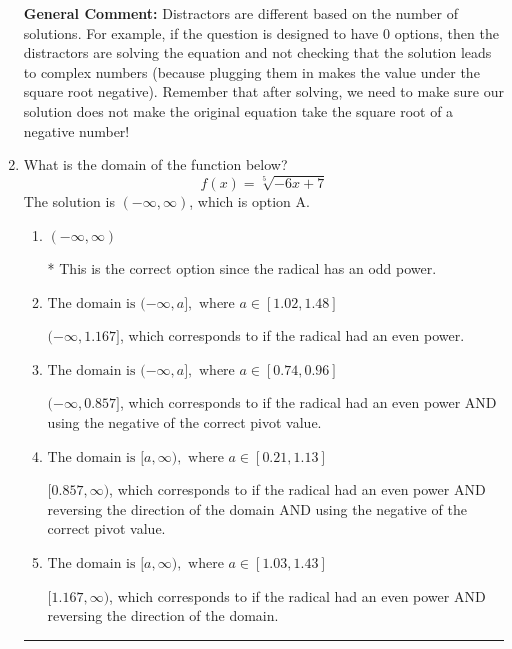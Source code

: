 \documentclass{extbook}[14pt]
\newcommand{\litem}[1]{\item #1

\rule{\textwidth}{0.4pt}}
\begin{document}
\begin{enumerate}
{\textbf{General Comment:} Distractors are different based on the number of solutions. For example, if the question is designed to have 0 options, then the distractors are solving the equation and not checking that the solution leads to complex numbers (because plugging them in makes the value under the square root negative). Remember that after solving, we need to make sure our solution does not make the original equation take the square root of a negative number!
}
\litem{
What is the domain of the function below?
\[ f(x) = \sqrt[5]{-6 x + 7} \]The solution is \( (-\infty, \infty) \), which is option A.\begin{enumerate}[label=\Alph*.]
\item \( (-\infty, \infty) \)

* This is the correct option since the radical has an odd power.
\item \( \text{The domain is } (-\infty, a], \text{   where } a \in [1.02, 1.48] \)

$(-\infty, 1.167]$, which corresponds to if the radical had an even power.
\item \( \text{The domain is } (-\infty, a], \text{   where } a \in [0.74, 0.96] \)

$(-\infty, 0.857]$, which corresponds to if the radical had an even power AND using the negative of the correct pivot value.
\item \( \text{The domain is } [a, \infty), \text{   where } a \in [0.21, 1.13] \)

$[0.857, \infty)$, which corresponds to if the radical had an even power AND reversing the direction of the domain AND using the negative of the correct pivot value.
\item \( \text{The domain is } [a, \infty), \text{   where } a \in [1.03, 1.43] \)

$[1.167, \infty)$, which corresponds to if the radical had an even power AND reversing the direction of the domain.
\end{enumerate}

}
\end{enumerate}
\end{document}
